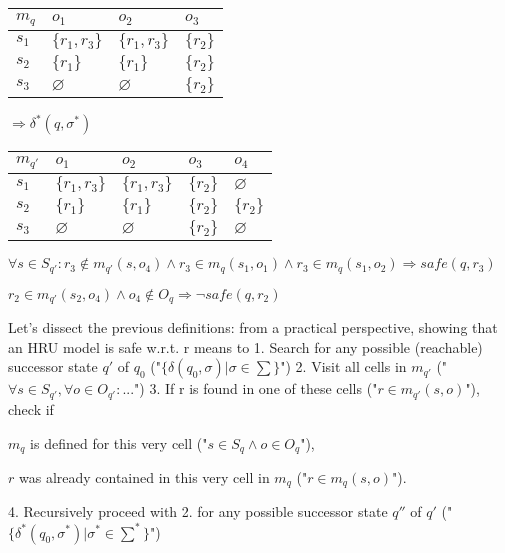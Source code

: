 \documentclass[a4paper]{article}
\begin{document}
\begin{multicols}{3}
\begin{itemize*}
\begin{itemize*}
                        \begin{tabular}{l|l|l|l}
                            $m_q$ & $o_1$         & $o_2$         & $o_3$     \\\hline
                            $s_1$ & $\{r_1,r_3\}$ & $\{r_1,r_3\}$ & $\{r_2\}$ \\
                            $s_2$ & $\{r_1\}$     & $\{r_1\}$     & $\{r_2\}$ \\
                            $s_3$ & $\varnothing$ & $\varnothing$ & $\{r_2\}$
                        \end{tabular}
                        \begin{itemize*}
                            \item       $\Rightarrow \delta^*(q,\sigma^*)$
                        \end{itemize*}
                        \begin{tabular}{l|l|l|l|l}
                            $m_{q'}$ & $o_1$         & $o_2$         & $o_3$     & $o_4$         \\\hline
                            $s_1$    & $\{r_1,r_3\}$ & $\{r_1,r_3\}$ & $\{r_2\}$ & $\varnothing$ \\
                            $s_2$    & $\{r_1\}$     & $\{r_1\}$     & $\{r_2\}$ & $\{r_2\}$     \\
                            $s_3$    & $\varnothing$ & $\varnothing$ & $\{r_2\}$ & $\varnothing$
                        \end{tabular}
                        \begin{itemize*}
                            \item $\forall s\in S_{q'}:r_3\not\in m_{q'}(s,o_4)\wedge r_3\in m_q(s_1,o_1)\wedge r_3\in m_q(s_1,o_2)\Rightarrow safe(q,r_3)$
                            \item $r_2\in m_{q'}(s_2,o_4)\wedge o_4\not\in O_q\Rightarrow\lnot safe(q,r_2)$
                        \end{itemize*}
              \end{itemize*}
    \end{itemize*}

    Let’s dissect the previous definitions: from a practical perspective, showing that an HRU model is safe w.r.t. r means to
    1. Search for any possible (reachable) successor state $q'$ of $q_0$ ("$\{\delta(q_0,\sigma)|\sigma\in\sum\}$")
    2. Visit all cells in $m_{q'}$ ("$\forall s\in S_{q'},\forall o\in O_{q'}:...$")
    3. If r is found in one of these cells ("$r\in m_{q'}(s,o)$"), check if
    \begin{itemize*}
        \item $m_q$ is defined for this very cell ("$s\in S_q\wedge o\in O_q$"),
        \item $r$ was already contained in this very cell in $m_q$ ("$r\in m_q(s,o)$").
    \end{itemize*}
    4. Recursively proceed with 2. for any possible successor state $q''$ of $q'$ ("$\{\delta^*(q_0,\sigma^*)|\sigma^*\in\sum^*\}$")


\end{multicols}
\end{document}
